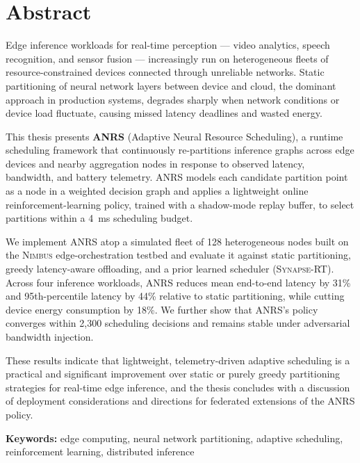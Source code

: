 \chapter*{Abstract}
\thispagestyle{plain}

Edge inference workloads for real-time perception --- video analytics, speech recognition, and sensor fusion --- increasingly run on heterogeneous fleets of resource-constrained devices connected through unreliable networks. Static partitioning of neural network layers between device and cloud, the dominant approach in production systems, degrades sharply when network conditions or device load fluctuate, causing missed latency deadlines and wasted energy.

This thesis presents \textbf{ANRS} (Adaptive Neural Resource Scheduling), a runtime scheduling framework that continuously re-partitions inference graphs across edge devices and nearby aggregation nodes in response to observed latency, bandwidth, and battery telemetry. ANRS models each candidate partition point as a node in a weighted decision graph and applies a lightweight online reinforcement-learning policy, trained with a shadow-mode replay buffer, to select partitions within a 4~ms scheduling budget.

We implement ANRS atop a simulated fleet of 128 heterogeneous nodes built on the \textsc{Nimbus} edge-orchestration testbed and evaluate it against static partitioning, greedy latency-aware offloading, and a prior learned scheduler (\textsc{Synapse-RT}). Across four inference workloads, ANRS reduces mean end-to-end latency by 31\% and 95th-percentile latency by 44\% relative to static partitioning, while cutting device energy consumption by 18\%. We further show that ANRS's policy converges within 2,300 scheduling decisions and remains stable under adversarial bandwidth injection.

These results indicate that lightweight, telemetry-driven adaptive scheduling is a practical and significant improvement over static or purely greedy partitioning strategies for real-time edge inference, and the thesis concludes with a discussion of deployment considerations and directions for federated extensions of the ANRS policy.

\vspace{0.3in}
\noindent\textbf{Keywords:} edge computing, neural network partitioning, adaptive scheduling, reinforcement learning, distributed inference


